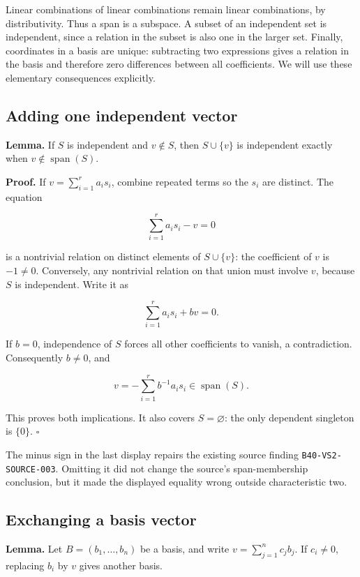 \documentclass[
  english,
]{article}
\begin{document}
Linear combinations of linear combinations remain linear combinations,
by distributivity. Thus a span is a subspace. A subset of an independent
set is independent, since a relation in the subset is also one in the
larger set. Finally, coordinates in a basis are unique: subtracting two
expressions gives a relation in the basis and therefore zero differences
between all coefficients. We will use these elementary consequences
explicitly.

\subsection{Adding one independent
vector}\label{adding-one-independent-vector}

\textbf{Lemma.} If \(S\) is independent and \(v\notin S\), then
\(S\cup\{v\}\) is independent exactly when
\(v\notin\operatorname{span}(S)\).

\textbf{Proof.} If \(v=\sum_{i=1}^r a_i s_i\), combine repeated terms so
the \(s_i\) are distinct. The equation

\[
\sum_{i=1}^r a_i s_i-v=0
\]

is a nontrivial relation on distinct elements of \(S\cup\{v\}\): the
coefficient of \(v\) is \(-1\ne0\). Conversely, any nontrivial relation
on that union must involve \(v\), because \(S\) is independent. Write it
as

\[
\sum_{i=1}^r a_i s_i+bv=0.
\]

If \(b=0\), independence of \(S\) forces all other coefficients to
vanish, a contradiction. Consequently \(b\ne0\), and

\[
v=-\sum_{i=1}^r b^{-1}a_i s_i\in\operatorname{span}(S).
\]

This proves both implications. It also covers \(S=\varnothing\): the
only dependent singleton is \(\{0\}\). \(\square\)

The minus sign in the last display repairs the existing source finding
\texttt{B40-VS2-SOURCE-003}. Omitting it did not change the source's
span-membership conclusion, but it made the displayed equality wrong
outside characteristic two.

\subsection{Exchanging a basis vector}\label{exchanging-a-basis-vector}

\textbf{Lemma.} Let \(B=(b_1,\ldots,b_n)\) be a basis, and write
\(v=\sum_{j=1}^n c_jb_j\). If \(c_i\ne0\), replacing \(b_i\) by \(v\)
gives another basis.
\end{document}
